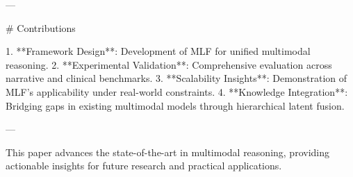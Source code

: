 ---

# Contributions

1. **Framework Design**: Development of MLF for unified multimodal reasoning.
2. **Experimental Validation**: Comprehensive evaluation across narrative and clinical benchmarks.
3. **Scalability Insights**: Demonstration of MLF's applicability under real-world constraints.
4. **Knowledge Integration**: Bridging gaps in existing multimodal models through hierarchical latent fusion.

--- 

This paper advances the state-of-the-art in multimodal reasoning, providing actionable insights for future research and practical applications.